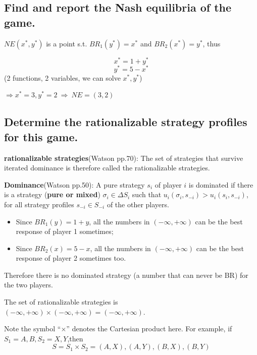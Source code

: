 \documentclass{article}
\begin{document}
\subsection{Find and report the Nash equilibria of the game.}

$NE(x^*,y^*)$ is a point s.t. $BR_1(y^*) = x^*$ and $BR_2(x^*)=y^*$, thus

$$x^* = 1+y^*$$
$$y^* = 5-x^*$$
(2 functions, 2 variables, we can solve $x^*,y^*$)

$\Rightarrow x^*= 3, y^*=2 \ \Rightarrow \ NE=(3,2)$

\subsection{Determine the rationalizable strategy profiles for this game.}

\begin{mdframed}[backgroundcolor=blue!20,linecolor=white]

\textbf{rationalizable strategies}(Watson pp.70): The set of strategies that
survive iterated dominance is therefore called the rationalizable strategies.

\textbf{Dominance}(Watson pp.50): A pure strategy $s_i$ of player $i$ is dominated if there is a strategy (\textbf{pure or mixed}) $\sigma_i \in \Delta S_i$ such that $u_i(\sigma_i , s_{-i}) > u_i (s_i , s_{-i})$, for all strategy profiles $s_{-i} \in S_{-i}$ of the other players.

\end{mdframed}

\begin{itemize}
\item Since $BR_1(y) = 1+y$, all the numbers in $(-\infty,+\infty)$ can be the best response of player 1 sometimes;
\item Since $BR_2(x) = 5-x$, all the numbers  in $(-\infty,+\infty)$ can be the best response of player 2 sometimes too.

\end{itemize}

Therefore there is no dominated strategy (a number that can never be BR) for the two players.

The set of rationalizable strategies is $(-\infty, +\infty) \times (-\infty, +\infty) = (-\infty, +\infty)$.

\begin{mdframed}[backgroundcolor=blue!20,linecolor=white]
Note the symbol ``$\times$'' denotes the Cartesian product here. For example, if $S_1={A,B}, S_2={X,Y}$,then $$S= S_1 \times S_2 = {(A,X),(A,Y),(B,X),(B,Y)}$$
\end{mdframed}
\end{document}
